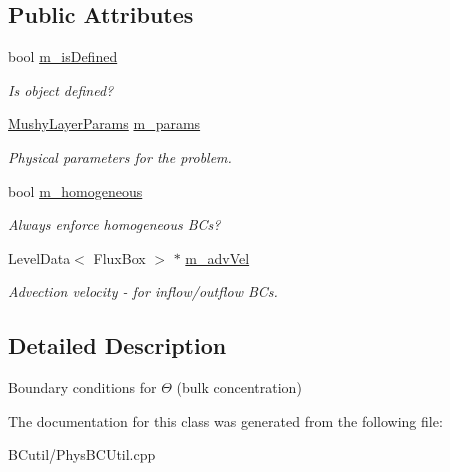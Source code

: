 \subsection*{Public Attributes}
\begin{DoxyCompactItemize}
\item 
\hypertarget{class_basic_theta_b_c_function_a189270a235d3fc2ac7da5109f88ba1cf}{bool \hyperlink{class_basic_theta_b_c_function_a189270a235d3fc2ac7da5109f88ba1cf}{m\-\_\-is\-Defined}}\label{class_basic_theta_b_c_function_a189270a235d3fc2ac7da5109f88ba1cf}

\begin{DoxyCompactList}\small\item\em Is object defined? \end{DoxyCompactList}\item 
\hypertarget{class_basic_theta_b_c_function_a63684816e20f90df61c663d5e1df87d5}{\hyperlink{class_mushy_layer_params}{Mushy\-Layer\-Params} \hyperlink{class_basic_theta_b_c_function_a63684816e20f90df61c663d5e1df87d5}{m\-\_\-params}}\label{class_basic_theta_b_c_function_a63684816e20f90df61c663d5e1df87d5}

\begin{DoxyCompactList}\small\item\em Physical parameters for the problem. \end{DoxyCompactList}\item 
\hypertarget{class_basic_theta_b_c_function_a35b3a4e89e1489dacac67132e84fdd19}{bool \hyperlink{class_basic_theta_b_c_function_a35b3a4e89e1489dacac67132e84fdd19}{m\-\_\-homogeneous}}\label{class_basic_theta_b_c_function_a35b3a4e89e1489dacac67132e84fdd19}

\begin{DoxyCompactList}\small\item\em Always enforce homogeneous B\-Cs? \end{DoxyCompactList}\item 
\hypertarget{class_basic_theta_b_c_function_a84fe8181486060e6c14c458d0d8f1ae2}{Level\-Data$<$ Flux\-Box $>$ $\ast$ \hyperlink{class_basic_theta_b_c_function_a84fe8181486060e6c14c458d0d8f1ae2}{m\-\_\-adv\-Vel}}\label{class_basic_theta_b_c_function_a84fe8181486060e6c14c458d0d8f1ae2}

\begin{DoxyCompactList}\small\item\em Advection velocity -\/ for inflow/outflow B\-Cs. \end{DoxyCompactList}\end{DoxyCompactItemize}


\subsection{Detailed Description}
Boundary conditions for $ \Theta $ (bulk concentration) 

The documentation for this class was generated from the following file\-:\begin{DoxyCompactItemize}
\item 
B\-Cutil/Phys\-B\-C\-Util.\-cpp\end{DoxyCompactItemize}
